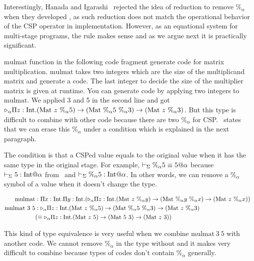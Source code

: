Interestingly, Hanada and Igarashi~\cite{Hanada2014} rejected the idea of
reduction to remove $\%_\alpha$ when they developed \LTP{}, as such
reduction does not match the operational behavior of the CSP operator
in implementation.  However, as an equational system for multi-stage
programs, the rule \QPercent makes sense and as we argue next
it is practically significant.


$\text{mulmat}$ function in the following code fragment generate code for matrix multiplication.
$\text{mulmat}$ takes two integers which are the size of the multiplicand matrix and generate a code.
The last integer to decide the size of the multiplier matrix is given at runtime.
You can generate code by applying two integers to $\text{mulmat}$.
We applied 3 and 5 in the second line and got ${\mathop{\triangleright}}_\alpha \Pi z:\textrm{Int}.(\textrm{Mat}\ z\ \%_\alpha 5) \to (\textrm{Mat}\ \%_\alpha 5\ \%_\alpha 3) \to (\textrm{Mat}\ z\ \%_\alpha 3)$.
But this type is difficult to combine with other code because there are two $\%_\alpha$ for CSP.
\QPercent\ states that we can erase this $\%_\alpha$ under a condition which is explained in the next paragraph.

The condition is that a CSPed value equals to the original value when it has the same type in the original stage.
For example, $\vdash_\Sigma \%_\alpha 5 \equiv 5 @ \alpha$ because $ \vdash_\Sigma 5 : \textrm{Int} @ \alpha $ from \TConst\ and  $ \vdash_\Sigma \%_\alpha 5 : \textrm{Int} @ \alpha$.
In other words, we can remove a $\%_\alpha$ symbol of a value when it doesn't change the type.

	{
		\begin{align*}
			\text{mulmat}       & : \Pi x:\textrm{Int}.\Pi y:\textrm{Int}.({\mathop{\triangleright}}_\alpha \Pi z:\textrm{Int}.(\textrm{Mat}\ z\ \%_\alpha y) \to (\textrm{Mat}\ \%_\alpha y\ \%_\alpha x) \to (\textrm{Mat}\ z\ \%_\alpha x)) \\
			\text{mulmat}\ 3\ 5 & : {\mathop{\triangleright}}_\alpha \Pi z:\textrm{Int}.(\textrm{Mat}\ z\ \%_\alpha 5) \to (\textrm{Mat}\ \%_\alpha 5\ \%_\alpha 3) \to (\textrm{Mat}\ z\ \%_\alpha 3)                     \\
			                    & (\equiv {\mathop{\triangleright}}_\alpha \Pi z:\textrm{Int}.(\textrm{Mat}\ z\ 5) \to (\textrm{Mat}\ 5\ 3) \to (\textrm{Mat}\ z\ 3) )                                                         \\
		\end{align*}
	}

This kind of type equivalence is very useful when we combine $\text{mulmat}\ 3\ 5$ with another code.
We cannot remove $\%_\alpha$ in the type without \QPercent and it makes very difficult to combine
because types of codes don't contain $\%_\alpha$ generally.

